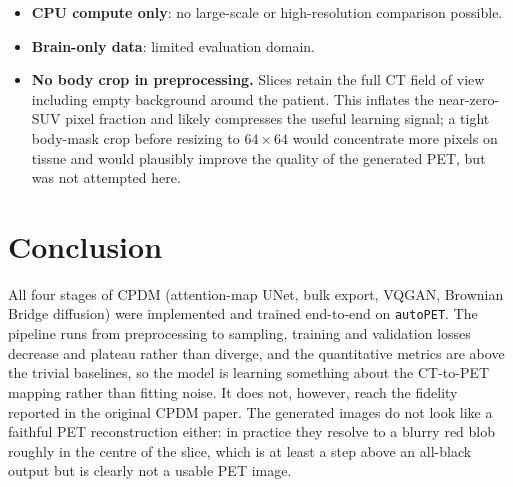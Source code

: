 \documentclass[11pt,a4paper]{article}
\begin{document}
\begin{itemize}
  \item \textbf{CPU compute only}: no large-scale or high-resolution comparison possible.
  \item \textbf{Brain-only data}: limited evaluation domain.
  \item \textbf{No body crop in preprocessing.} Slices retain the full CT field of view including empty background around the patient. This inflates the near-zero-SUV pixel fraction and likely compresses the useful learning signal; a tight body-mask crop before resizing to $64 \times 64$ would concentrate more pixels on tissue and would plausibly improve the quality of the generated PET, but was not attempted here.
\end{itemize}

\section{Conclusion}

All four stages of CPDM (attention-map UNet, bulk export, VQGAN, Brownian Bridge 
diffusion) were implemented and trained end-to-end on \texttt{autoPET}. 
The pipeline runs from preprocessing to sampling, training and validation losses decrease and 
plateau rather than diverge, and the quantitative metrics are above 
the trivial baselines, so the model is learning something about the CT-to-PET 
mapping rather than fitting noise. It does not, however, reach the fidelity 
reported in the original CPDM paper. The generated images do not look like a 
faithful PET reconstruction either: in practice they resolve to a blurry red 
blob roughly in the centre of the slice, which is at least a step above an 
all-black output but is clearly not a usable PET image.

\printbibliography
\end{document}
